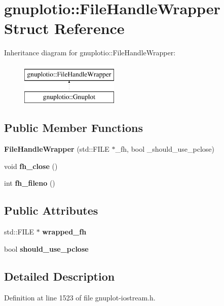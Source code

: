 \hypertarget{structgnuplotio_1_1_file_handle_wrapper}{}\section{gnuplotio\+:\+:File\+Handle\+Wrapper Struct Reference}
\label{structgnuplotio_1_1_file_handle_wrapper}
Inheritance diagram for gnuplotio\+:\+:File\+Handle\+Wrapper\+:\begin{figure}[H]
\begin{center}
\leavevmode
\includegraphics[height=2.000000cm]{structgnuplotio_1_1_file_handle_wrapper}
\end{center}
\end{figure}
\subsection*{Public Member Functions}
\begin{DoxyCompactItemize}
\item 
{\bfseries File\+Handle\+Wrapper} (std\+::\+F\+I\+LE $\ast$\+\_\+fh, bool \+\_\+should\+\_\+use\+\_\+pclose)\hypertarget{structgnuplotio_1_1_file_handle_wrapper_a26b2378e193a9c41be5aed97e11f9411}{}\label{structgnuplotio_1_1_file_handle_wrapper_a26b2378e193a9c41be5aed97e11f9411}

\item 
void {\bfseries fh\+\_\+close} ()\hypertarget{structgnuplotio_1_1_file_handle_wrapper_acafac45efd9c78ce621af4f3228c6f67}{}\label{structgnuplotio_1_1_file_handle_wrapper_acafac45efd9c78ce621af4f3228c6f67}

\item 
int {\bfseries fh\+\_\+fileno} ()\hypertarget{structgnuplotio_1_1_file_handle_wrapper_a3202ccd15d624f26dd2cf699d3456de6}{}\label{structgnuplotio_1_1_file_handle_wrapper_a3202ccd15d624f26dd2cf699d3456de6}

\end{DoxyCompactItemize}
\subsection*{Public Attributes}
\begin{DoxyCompactItemize}
\item 
std\+::\+F\+I\+LE $\ast$ {\bfseries wrapped\+\_\+fh}\hypertarget{structgnuplotio_1_1_file_handle_wrapper_adcb58bfcd9dbdba000a7e7395bee2ef9}{}\label{structgnuplotio_1_1_file_handle_wrapper_adcb58bfcd9dbdba000a7e7395bee2ef9}

\item 
bool {\bfseries should\+\_\+use\+\_\+pclose}\hypertarget{structgnuplotio_1_1_file_handle_wrapper_a11b63ed64cf53167e26c5273778d90ea}{}\label{structgnuplotio_1_1_file_handle_wrapper_a11b63ed64cf53167e26c5273778d90ea}

\end{DoxyCompactItemize}


\subsection{Detailed Description}


Definition at line 1523 of file gnuplot-\/iostream.\+h.

